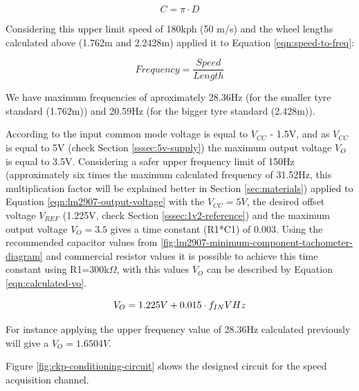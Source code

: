 			\begin{equation}\label{eqn:diameter-to-length}
				C = \pi \cdot D
			\end{equation}

			Considering this upper limit speed of 180kph (50 m/s) and the wheel lengths calculated above (1.762m and 2.2428m) applied it to Equation \ref{eqn:speed-to-freq}:

			\begin{equation}\label{eqn:speed-to-freq}
				Frequency = \frac{Speed}{Length}
			\end{equation}

			We have maximum frequencies of aproximately 28.36Hz (for the smaller tyre standard (1.762m)) and 20.59Hz (for the bigger tyre standard (2.428m)). 
			\par
			According to \cite{lm2907-datasheet} the input common mode voltage is equal to $V_{CC}$ - 1.5V, and as $V_{CC}$ is equal to 5V (check Section \ref{sssec:5v-supply}) the maximum output voltage $V_{O}$ is equal to 3.5V. Considering a safer upper frequency limit of 150Hz (approximately six times the maximum calculated frequency of 31.52Hz, this multiplication factor will be explained better in Section \ref{sec:materials}) applied to Equation \ref{eqn:lm2907-output-voltage} with the $V_{CC}=5V$, the desired offset voltage $V_{REF}$ (1.225V, check Section \ref{sssec:1v2-reference}) and the maximum output voltage $V_{O}=3.5$ gives a time constant (R1*C1) of 0.003. Using the recommended capacitor values from \ref{fig:lm2907-minimum-component-tachometer-diagram} and commercial resistor values it is possible to achieve this time constant using R1=300k$\Omega$, with this values $V_{O}$ can be described by Equation \ref{eqn:calculated-vo}.

			\begin{equation}\label{eqn:calculated-vo}
				V_{O}=1.225V + 0.015 \cdot f_{IN}   V\/Hz
			\end{equation}

			For instance applying the upper frequency value of 28.36Hz calculated previously will give a $V_{O}=1.6504V$.
			\par

			\par
			Figure \ref{fig:ckp-conditioning-circuit} shows the designed circuit for the speed acquisition channel.

